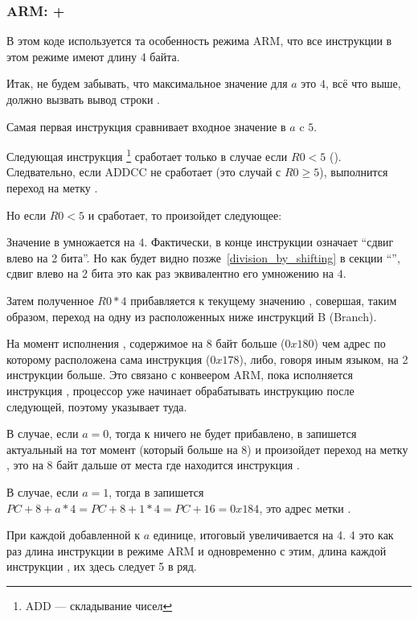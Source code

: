﻿%
\subsubsection{ARM: \OptimizingKeil + \ARMMode}



В этом коде используется та особенность режима ARM, что все инструкции в этом режиме имеют длину 4 байта.

Итак, не будем забывать, что максимальное значение для $a$ это $4$, всё что выше, должно вызвать
вывод строки .

Самая первая инструкция  сравнивает входное значение в $a$ c $5$.

Следующая инструкция \footnote{ADD --- складывание чисел}
сработает только в случае если $R0 < 5$
(). Следвательно, если ADDCC не сработает (это случай с $R0 \geq 5$),
выполнится переход на метку .

Но если $R0 < 5$ и  сработает, то произойдет следующее:

Значение в \Rzero умножается на $4$.
Фактически,  в конце инструкции означает ``сдвиг влево на 2 бита''. Но как будет видно 
позже~\ref{division_by_shifting} в секции ``\ShiftsSectionName'', 
сдвиг влево на 2 бита это как раз эквивалентно его умножению на $4$.

Затем полученное $R0*4$ прибавляется к текущему значению \PC, совершая, таким образом, 
переход на одну из расположенных ниже инструкций B (Branch).

На момент исполнения , содержимое \PC на 8 байт больше ($0x180$) чем адрес по которому 
расположена сама
инструкция  ($0x178$), либо, говоря иным языком, на 2 инструкции больше. 
Это связано с конвеером ARM,
пока исполняется инструкция , процессор уже начинает обрабатывать инструкцию после следующей, 
поэтому
\PC указывает туда.

В случае, если $a=0$, тогда к \PC ничего не будет прибавлено, в \PC запишется актуальный на тот момент \PC
(который больше на 8) и произойдет переход на метку , 
это на 8 байт дальше от места где находится инструкция . 

В случае, если $a=1$, тогда в \PC запишется $PC+8+a*4 = PC+8+1*4 = PC+16 = 0x184$, это адрес метки
.

При каждой добавленной к $a$ единице, итоговый \PC увеличивается на 4. 4 это как раз длина инструкции 
в режиме ARM и одновременно с этим, длина каждой инструкции , их здесь следует 5 в ряд.

